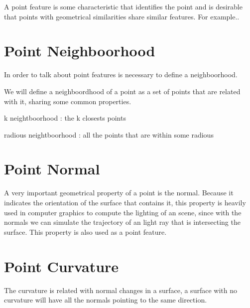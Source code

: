 
A point feature is some characteristic that identifies the point and is desirable 
that points with geometrical similarities share similar features. For example..

\section{Point Neighboorhood}

In order to talk about point features is necessary to define a neighboorhood. 

We will define a neighboordhood of a point as a set of points that are related 
with it, sharing some common properties.

k neightboorhood : the k closests points 

radious neightboorhood : all the points that are within some radious

\section{Point Normal}

A very important geometrical property of a point is the normal. 
Because it indicates the orientation of the surface that contains it,
this property is heavily used in computer graphics to compute the 
lighting of an scene, since with the normals we can simulate the 
trajectory of an light ray that is intersecting the surface.
This property is also used as a point feature.



\section{Point Curvature}

The curvature is related with normal changes in a surface, 
a surface with no curvature will have all the normals pointing 
to the same direction. 



